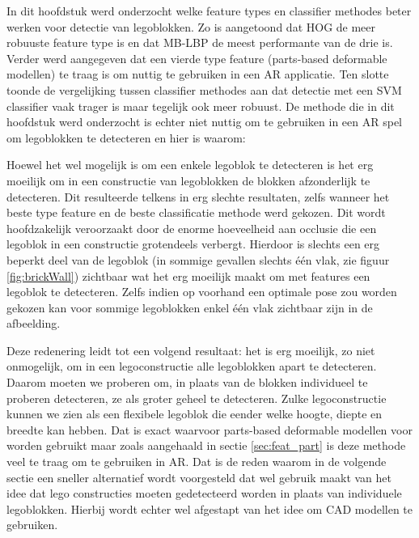 In dit hoofdstuk werd onderzocht welke feature types en classifier methodes beter werken voor detectie van legoblokken. Zo is aangetoond dat HOG de meer robuuste feature type is en dat MB-LBP de meest performante van de drie is. Verder werd aangegeven dat een vierde type feature (parts-based deformable modellen) te traag is om nuttig te gebruiken in een AR applicatie. Ten slotte toonde de vergelijking tussen classifier methodes aan dat detectie met een SVM classifier vaak trager is maar tegelijk ook meer robuust. De methode die in dit hoofdstuk werd onderzocht is echter niet nuttig om te gebruiken in een AR spel om legoblokken te detecteren en hier is waarom:

Hoewel het wel mogelijk is om een enkele legoblok te detecteren is het erg moeilijk om in een constructie van legoblokken de blokken afzonderlijk te detecteren. Dit resulteerde telkens in erg slechte resultaten, zelfs wanneer het beste type feature en de beste classificatie methode werd gekozen. Dit wordt hoofdzakelijk veroorzaakt door de enorme hoeveelheid aan occlusie die een legoblok in een constructie grotendeels verbergt. Hierdoor is slechts een erg beperkt deel van de legoblok (in sommige gevallen slechts \'e\'en vlak, zie figuur \ref{fig:brickWall}) zichtbaar wat het erg moeilijk maakt om met features een legoblok te detecteren. Zelfs indien op voorhand een optimale pose zou worden gekozen kan voor sommige legoblokken enkel \'e\'en vlak zichtbaar zijn in de afbeelding.

Deze redenering leidt tot een volgend resultaat: het is erg moeilijk, zo niet onmogelijk, om in een legoconstructie alle legoblokken apart te detecteren. Daarom moeten we proberen om, in plaats van de blokken individueel te proberen detecteren, ze als groter geheel te detecteren. Zulke legoconstructie kunnen we zien als een flexibele legoblok die eender welke hoogte, diepte en breedte kan hebben. Dat is exact waarvoor parts-based deformable modellen voor worden gebruikt maar zoals aangehaald in sectie \ref{sec:feat_part} is deze methode veel te traag om te gebruiken in AR. Dat is de reden waarom in de volgende sectie een sneller alternatief wordt voorgesteld dat wel gebruik maakt van het idee dat lego constructies moeten gedetecteerd worden in plaats van individuele legoblokken. Hierbij wordt echter wel afgestapt van het idee om CAD modellen te gebruiken.


